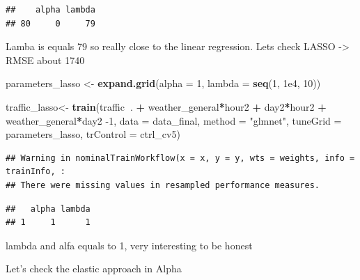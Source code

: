 \documentclass[
]{article}
\newenvironment{Shaded}{\begin{snugshade}}{\end{snugshade}}
\newcommand{\DataTypeTok}[1]{\textcolor[rgb]{0.13,0.29,0.53}{#1}}
\newcommand{\DecValTok}[1]{\textcolor[rgb]{0.00,0.00,0.81}{#1}}
\newcommand{\FloatTok}[1]{\textcolor[rgb]{0.00,0.00,0.81}{#1}}
\newcommand{\KeywordTok}[1]{\textcolor[rgb]{0.13,0.29,0.53}{\textbf{#1}}}
\newcommand{\NormalTok}[1]{#1}
\newcommand{\OperatorTok}[1]{\textcolor[rgb]{0.81,0.36,0.00}{\textbf{#1}}}
\newcommand{\StringTok}[1]{\textcolor[rgb]{0.31,0.60,0.02}{#1}}
\begin{document}
\begin{verbatim}
##    alpha lambda
## 80     0     79
\end{verbatim}

Lamba is equals 79 so really close to the linear regression. Lets check
LASSO -\textgreater{} RMSE about 1740

\begin{Shaded}
\begin{Highlighting}[]
\NormalTok{parameters_lasso <-}\StringTok{ }\KeywordTok{expand.grid}\NormalTok{(}\DataTypeTok{alpha =} \DecValTok{1}\NormalTok{,}
                                \DataTypeTok{lambda =} \KeywordTok{seq}\NormalTok{(}\DecValTok{1}\NormalTok{, }\FloatTok{1e4}\NormalTok{, }\DecValTok{10}\NormalTok{))}

\NormalTok{traffic_lasso<-}\StringTok{ }\KeywordTok{train}\NormalTok{(traffic}\OperatorTok{~}\NormalTok{. }\OperatorTok{+}\StringTok{ }\NormalTok{weather_general}\OperatorTok{*}\NormalTok{hour2  }\OperatorTok{+}\StringTok{ }\NormalTok{day2}\OperatorTok{*}\NormalTok{hour2 }\OperatorTok{+}\StringTok{ }\NormalTok{weather_general}\OperatorTok{*}\NormalTok{day2 }\DecValTok{-1}\NormalTok{,}
                      \DataTypeTok{data =}\NormalTok{ data_final,}
                      \DataTypeTok{method =} \StringTok{"glmnet"}\NormalTok{, }
                      \DataTypeTok{tuneGrid =}\NormalTok{ parameters_lasso,}
                      \DataTypeTok{trControl =}\NormalTok{ ctrl_cv5)}
\end{Highlighting}
\end{Shaded}

\begin{verbatim}
## Warning in nominalTrainWorkflow(x = x, y = y, wts = weights, info = trainInfo, :
## There were missing values in resampled performance measures.
\end{verbatim}

\begin{Shaded}
\end{Shaded}

\begin{verbatim}
##   alpha lambda
## 1     1      1
\end{verbatim}

lambda and alfa equals to 1, very interesting to be honest

Let's check the elastic approach in Alpha
\end{document}
